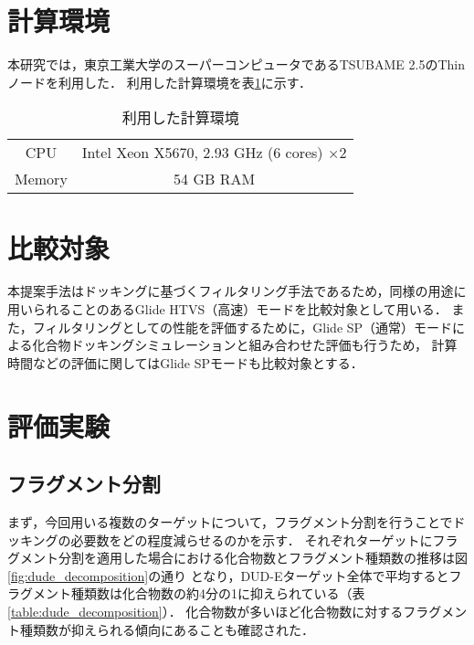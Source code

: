 \section{計算環境}
本研究では，東京工業大学のスーパーコンピュータであるTSUBAME 2.5のThinノードを利用した．
利用した計算環境を表\ref{table:computer_node}に示す．

\begin{table}[htb] \centering
	\caption{利用した計算環境}
	\label{table:computer_node}
	\begin{tabular}{cc}
	\hline
	CPU		&Intel Xeon X5670, 2.93 GHz (6 cores) $\times2$ \\
	Memory	& 54 GB RAM \\ \hline 
	\end{tabular}
	\vspace{-2cm}
\end{table}

\section{比較対象}
本提案手法はドッキングに基づくフィルタリング手法であるため，同様の用途に用いられることのあるGlide HTVS（高速）モードを比較対象として用いる．
また，フィルタリングとしての性能を評価するために，Glide SP（通常）モードによる化合物ドッキングシミュレーションと組み合わせた評価も行うため，
計算時間などの評価に関してはGlide SPモードも比較対象とする．

\section{評価実験}

\subsection{フラグメント分割}\label{subsec:result_decomposition}
まず，今回用いる複数のターゲットについて，フラグメント分割を行うことでドッキングの必要数をどの程度減らせるのかを示す．
それぞれターゲットにフラグメント分割を適用した場合における化合物数とフラグメント種類数の推移は図\ref{fig:dude_decomposition}の通り
となり，DUD-Eターゲット全体で平均するとフラグメント種類数は化合物数の約4分の1に抑えられている（表\ref{table:dude_decomposition}）．
化合物数が多いほど化合物数に対するフラグメント種類数が抑えられる傾向にあることも確認された．

